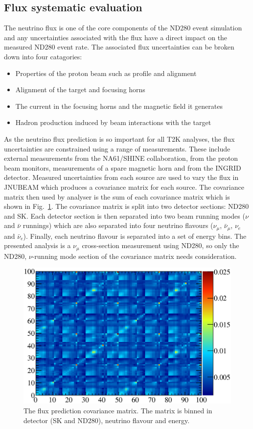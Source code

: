 \subsection{Flux systematic evaluation}
\label{subsec:FluxSystematic}
The neutrino flux is one of the core components of the ND280 event simulation and any uncertainties associated with the flux have a direct impact on the measured ND280 event rate.  The associated flux uncertainties can be broken down into four catagories:
\begin{itemize}
  \item Properties of the proton beam such as profile and alignment
  \item Alignment of the target and focusing horns
  \item The current in the focusing horns and the magnetic field it generates
  \item Hadron production induced by beam interactions with the target
\end{itemize}
As the neutrino flux prediction is so important for all T2K analyses, the flux uncertainties are constrained using a range of measurements.  These include external measurements from the NA61/SHINE collaboration, from the proton beam monitors, measurements of a spare magnetic horn and from the INGRID detector.  Measured uncertainties from each source are used to vary the flux in JNUBEAM which produces a covariance matrix for each source.  The covariance matrix then used by analyser is the sum of each covariance matrix which is shown in Fig.~\ref{fig:FluxPredictionSyst}.  The covariance matrix is split into two detector sections: ND280 and SK.  Each detector section is then separated into two beam running modes ($\nu$ and $\bar{\nu}$ runnings) which are also separated into four neutrino flavours ($\nu_\mu$, $\bar{\nu}_\mu$, $\nu_e$ and $\bar{\nu}_e$).  Finally, each neutrino flavour is separated into a set of energy bins.  The presented analysis is a $\nu_\mu$ cross-section measurement using ND280, so only the ND280, $\nu$-running mode section of the covariance matrix needs consideration.
\begin{figure}
  \centering
  \includegraphics[width=12cm]{images/measurement/systematics/flux/flux_prediction_syst.eps}
  \caption{The flux prediction covariance matrix.  The matrix is binned in detector (SK and ND280), neutrino flavour and energy.}
  \label{fig:FluxPredictionSyst}
\end{figure}
